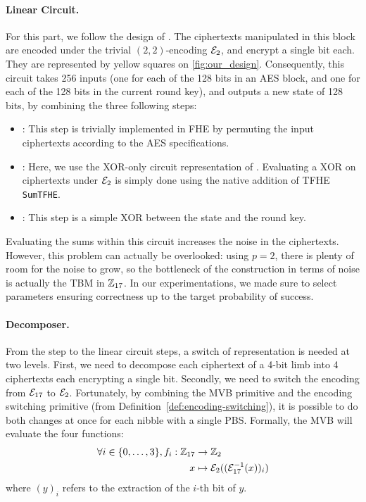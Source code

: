 \paragraph{Linear Circuit.} For this part, we follow the design of \cite{TCHES:BonPoiRiv24}. The ciphertexts manipulated in this block are encoded under the trivial $(2, 2)$-encoding $\mathcal{E}_2$, and encrypt a single bit each. They are represented by yellow squares on \ref{fig:our_design}. Consequently, this circuit takes 256 inputs (one for each of the 128 bits in an AES block, and one for each of the 128 bits in the current round key), and outputs a new state of 128 bits, by combining the three following steps:
\begin{itemize}
    \item \ShiftRows: This step is trivially implemented in FHE by permuting the input ciphertexts according to the AES specifications.
    \item \MixColumns: Here, we use the XOR-only circuit representation of \cite{EPRINT:Maximov19}. Evaluating a XOR on ciphertexts under $\mathcal{E}_2$ is simply done using the native addition of TFHE \texttt{SumTFHE}.
    \item \AddRoundKey: This step is a simple XOR between the state and the round key.
\end{itemize}

Evaluating the sums within this circuit increases the noise in the ciphertexts. However, this problem can actually be overlooked: using $p=2$, there is plenty of room for the noise to grow, so the bottleneck of the construction in terms of noise is actually the TBM in $\mathbb{Z}_{17}$. In our experimentations, we made sure to select parameters ensuring correctness up to the target probability of success.


\paragraph{Decomposer.} From the \SubBytes step to the linear circuit steps, a switch of representation is needed at two levels. First, we need to decompose each ciphertext of a 4-bit limb into 4 ciphertexts each encrypting a single bit. Secondly, we need to switch the encoding from $\mathcal{E}_{17}$ to $\mathcal{E}_2$. Fortunately, by combining the MVB primitive and the encoding switching primitive (from Definition~\ref{def:encoding-switching}), it is possible to do both changes at once for each nibble with a single PBS. Formally, the MVB will evaluate the four functions:
\begin{align*}
    \forall i \in \{0, \dots, 3\}, f_i: \mathbb{Z}_{17} &\rightarrow \mathbb{Z}_2\\
                                       x &\mapsto \mathcal{E}_2((\mathcal{E}_{17}^{-1}(x))_i)
\end{align*}
where $(y)_i$ refers to the extraction of the $i$-th bit of $y$.


